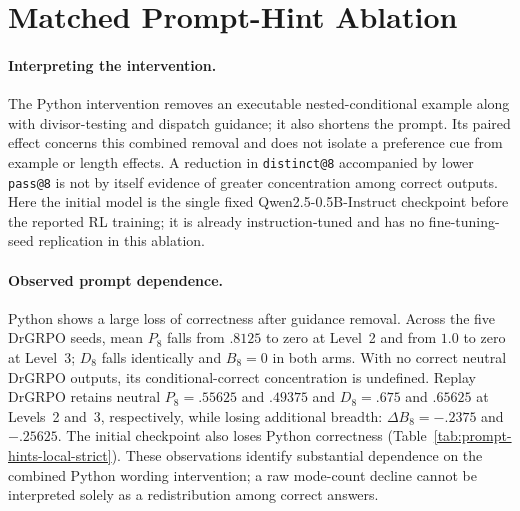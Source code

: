 \documentclass{article}
\newcommand{\1}{\mathbf 1}
\theoremstyle{remark}
\theoremstyle{definition}
\theoremstyle{plain}
\begin{document}
\clearpage

\section{Matched Prompt-Hint Ablation}
\label{app:prompt-hint-ablation}



\paragraph{Interpreting the intervention.}
The Python intervention removes an executable nested-conditional example
along with divisor-testing and dispatch guidance; it also shortens the prompt.
Its paired effect concerns this combined removal and does not isolate a
preference cue from example or length effects. A reduction in
\texttt{distinct@8} accompanied by lower \texttt{pass@8} is not by itself
evidence of greater concentration among correct outputs.
Here the initial model is the single fixed Qwen2.5-0.5B-Instruct checkpoint
before the reported RL training; it is already instruction-tuned and has no
fine-tuning-seed replication in this ablation.


\paragraph{Observed prompt dependence.}
Python shows a large loss of correctness after guidance removal. Across the
five DrGRPO seeds, mean $P_8$ falls from $.8125$ to zero at Level~2 and from
$1.0$ to zero at Level~3; $D_8$ falls identically and $B_8=0$ in both arms.
With no correct neutral DrGRPO outputs, its conditional-correct concentration
is undefined. Replay DrGRPO retains neutral $P_8=.55625$ and $.49375$ and
$D_8=.675$ and $.65625$ at Levels~2 and~3, respectively, while losing
additional breadth: $\Delta B_8=-.2375$ and $-.25625$. The initial checkpoint
also loses Python correctness (Table~\ref{tab:prompt-hints-local-strict}).
These observations identify substantial dependence on the combined Python
wording intervention; a raw mode-count decline cannot be interpreted solely
as a redistribution among correct answers.
\end{document}
